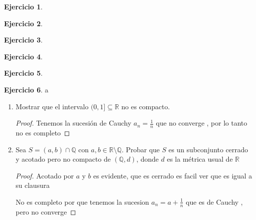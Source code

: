 \documentclass[11pt]{report}
\newcommand{\Q}{\mathbb{Q}}
\newcommand{\R}{\mathbb{R}}
\theoremstyle{definition}
\newtheorem{ej}{Ejercicio}
\begin{document}
	\begin{ej}
		
	\end{ej}

	\begin{ej}
		
	\end{ej}

	\begin{ej}
		
	\end{ej}

	\begin{ej}
		
	\end{ej}

	\begin{ej}
		
	\end{ej}

	\begin{ej}a
		\begin{enumerate}
			\item Mostrar que el intervalo $(0,1] \subseteq \R$ no es compacto.
				\begin{proof}
					Tenemos la sucesión de Cauchy $a_n = \frac{1}{n}$ que no converge , por lo tanto no es completo				
				\end{proof}
				
				
			\item Sea $S = (a,b) \cap \Q$ con $a,b \in \R \setminus \Q$. Probar que $S$ es un subconjunto cerrado y acotado pero no compacto de $(\Q,d)$, donde $d$ es la métrica usual de $\R$
				\begin{proof}
					Acotado por $a$ y $b$ es evidente, que es cerrado es facil ver que es igual a su clausura
					
					No es completo por que tenemos la sucesion $a_n = a + \frac{1}{n}$ que es de Cauchy , pero no converge
				\end{proof}
		\end{enumerate}
	\end{ej}
	
\end{document}
